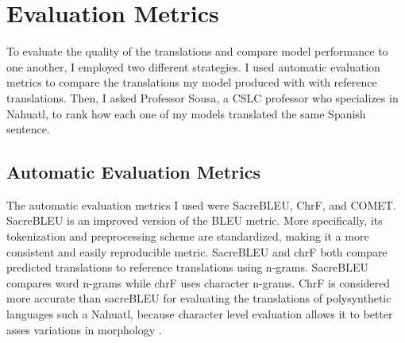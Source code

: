 \documentclass[10pt,twocolumn]{article}
\begin{document}
\section{Evaluation Metrics}

To evaluate the quality of the translations and compare model performance to one another, I employed two different strategies. I used automatic evaluation metrics to compare the translations my model produced with with reference translations. Then, I asked Professor Sousa, a CSLC professor who specializes in Nahuatl, to rank how each one of my models translated the same Spanish sentence.

\subsection{Automatic Evaluation Metrics}

The automatic evaluation metrics I used were SacreBLEU, ChrF, and COMET. SacreBLEU is an improved version of the BLEU metric. More specifically, its tokenization and preprocessing scheme are standardized, making it a more consistent and easily reproducible metric. SacreBLEU and chrF both compare predicted translations to reference translations using n-grams. SacreBLEU compares word n-grams while chrF uses character n-grams. ChrF is considered more accurate than sacreBLEU for evaluating the translations of polysynthetic languages such a Nahuatl, because character level evaluation allows it to better asses variations in morphology \cite{BLEU} \cite{ChrF}. 
\end{document}
